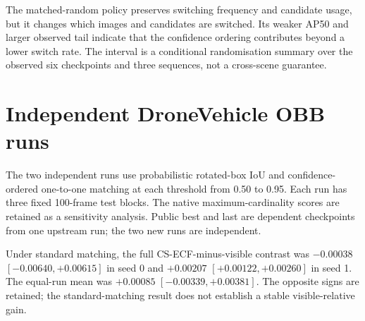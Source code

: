 \documentclass[11pt]{article}
\begin{document}
The matched-random policy preserves switching frequency and candidate usage,
but it changes which images and candidates are switched. Its weaker AP50 and
larger observed tail indicate that the confidence ordering contributes beyond
a lower switch rate. The interval is a conditional randomisation summary over
the observed six checkpoints and three sequences, not a cross-scene guarantee.

\section{Independent DroneVehicle OBB runs}

The two independent runs use probabilistic rotated-box IoU and
confidence-ordered one-to-one matching at each threshold from 0.50 to 0.95.
Each run has three fixed 100-frame test blocks. The native
maximum-cardinality scores are retained as a sensitivity analysis. Public best
and last are dependent checkpoints from one upstream run; the two new runs are
independent.

\begin{table}[ht]
\centering
\small
\setlength{\tabcolsep}{3pt}
\caption{Independent DroneVehicle evaluation under standard
confidence-ordered matching. Absolute values are pooled AP50. Difference means
are equal-block means over the three fixed 100-frame groups; they are not
differences of the pooled entries. CS is full CS-ECF and NS is no shield.}
\label{tab:drone-standard}
\end{table}

Under standard matching, the full CS-ECF-minus-visible contrast was
\(-0.00038\) \([-0.00640,+0.00615]\) in seed 0 and \(+0.00207\)
\([+0.00122,+0.00260]\) in seed 1. The equal-run mean was \(+0.00085\)
\([-0.00339,+0.00381]\). The opposite signs are retained; the standard-matching
result does not establish a stable visible-relative gain.
\end{document}
